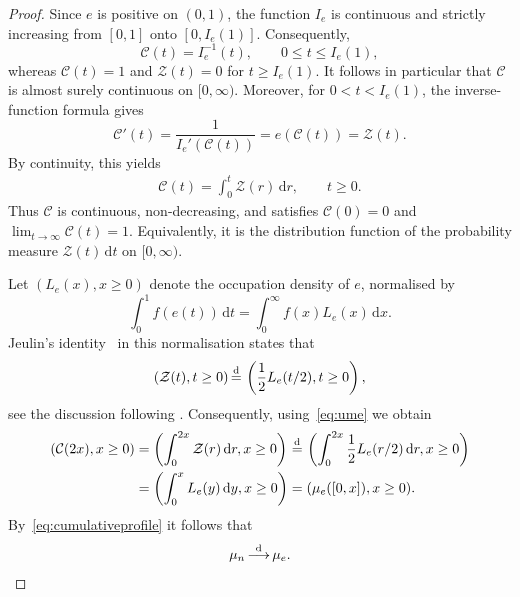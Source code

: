 \documentclass[english,11pt]{smfart}
\newcommand{\convdis}{\,{\buildrel \mathrm{d} \over \longrightarrow}\,}
\newcommand{\eqdist}{\,{\buildrel \mathrm{d} \over =}\,}
\numberwithin{equation}{section}
\begin{document}
\begin{proof}
	Since $e$ is positive on $(0,1)$, the function $I_e$ is continuous and strictly increasing from $[0,1]$ onto $[0,I_e(1)]$. Consequently,
	\[
		\mathcal{C}(t) = I_e^{-1}(t), \qquad 0 \le t \le I_e(1),
	\]
	whereas $\mathcal C(t)=1$ and $\mathcal Z(t)=0$ for $t \ge I_e(1)$. It follows in particular that $\mathcal C$ is almost surely continuous on $[0,\infty)$. Moreover, for $0<t<I_e(1)$, the inverse-function formula gives
	\[
		\mathcal{C}'(t) = \frac{1}{I_e'(\mathcal C(t))} = e(\mathcal{C}(t)) = \mathcal{Z}(t).
	\]
	By continuity, this yields
	\begin{align}
		\label{eq:ume}
		\mathcal{C}(t) = \int_0^t\mathcal{Z}(r)\,\mathrm{d}r, \qquad t\ge0.
	\end{align}
	Thus $\mathcal{C}$ is continuous, non-decreasing, and satisfies $\mathcal{C}(0)=0$ and $\lim_{t\to\infty}\mathcal C(t)=1$. Equivalently, it is the distribution function of the probability measure $\mathcal Z(t)\,\mathrm{d}t$ on $[0,\infty)$.
	
	Let $(L_e(x),x\ge 0)$ denote the occupation density of $e$, normalised by
	\[
	\int_0^1 f(e(t))\,\mathrm{d}t
	=\int_0^\infty f(x)L_e(x)\,\mathrm{d}x.
	\]
	Jeulin's identity~\cite{zbMATH03896047} in this normalisation states that
	\begin{align*}
		(\mathcal{Z}(t), t\ge 0) \eqdist \left(\frac{1}{2} L_e(t/2), t\ge 0\right),
	\end{align*}
	see the discussion following \cite[Thm.~1]{angtuncio2020profiletreesgivendegree}. Consequently, using~\eqref{eq:ume} we obtain
	\begin{align*}
		(\mathcal{C}(2x), x\ge0) &= \left(\int_0^{2x}\mathcal Z(r)\,\mathrm{d}r,x\ge0\right) \eqdist \left(\int_0^{2x}\frac12L_e(r/2)\,\mathrm{d}r,x\ge0\right)\\
		&= \left(\int_0^xL_e(y)\,\mathrm{d}y,x\ge0\right) = (\mu_e([0,x]),x\ge0).
	\end{align*}
	By~\eqref{eq:cumulativeprofile} it follows that
	\begin{align}
		\label{eq:mun}
		\mu_n \convdis \mu_e.
 	\end{align}
	
	
	

\end{proof}
\end{document}
